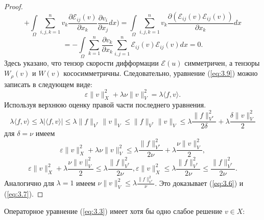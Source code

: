 \begin{proof}
$$+\int\limits_{\Omega}\sum_{i,j,k=1}^nv_k\frac{\partial\mathcal{E}_{ij}(v)}{\partial x_k}\frac{\partial v_i}{\partial x_j}dx\bigg)=
\int\limits_{\Omega}\sum_{i,j,k=1}^n v_k\frac{\partial (\mathcal{E}_{ij}(v)\mathcal{E}_{ij}(v))}{\partial x_k}dx$$
$$=-\int\limits_{\Omega}\sum_{k=1}^n \frac{\partial v_k}{\partial x_k}\sum_{i,j=1}^n\mathcal{E}_{ij}(v)\mathcal{E}_{ij}(v)dx=0.$$
Здесь указано, что тензор скорости дифформации $\mathcal{E}(u)$ симметричен, а тензоры $W_{\rho}(v)$ и $W(v)$ кососимметричны. 
Следовательно, уравнение (\ref{eq:3.9}) можно записать в следующем виде:
$$\varepsilon\|v\|^2_X+\lambda\nu\|v\|^2_V=\lambda\langle f,v\rangle.$$
Используя верхнюю оценку правой части последнего уравнения.
$$\lambda\langle f,v\rangle\leqslant\lambda |\langle f,v\rangle|\leqslant\lambda\|f\|_{V^*}\|v\|_V\leqslant\|f\|_{V^*}\|v\|_V\leqslant
\lambda\frac{\|f\|_{V^*}^2}{2\delta}+\lambda\frac{\delta\|v\|_V^2}{2}$$
для $\delta=\nu$ имеем
$$\varepsilon\|v\|^2_X+\lambda\nu\|v\|^2_V\leqslant\lambda\frac{\|f\|^2_{V^*}}{2\nu}+\lambda\frac{\nu\|v\|^2_V}{2},$$
$$\varepsilon\|v\|^2_X+\lambda\frac{\nu\|v\|^2_V}{2}\leqslant\lambda\frac{\|f\|^2_{V^*}}{2\nu}, \varepsilon\|v\|^2_X\leqslant\lambda
\frac{\|f\|^2_{V^*}}{2\nu}\leqslant\frac{\|f\|^2_{V^*}}{2\nu}.$$
Аналогично для $\lambda=1$ имеем $\nu\|v\|^2_V\leqslant\lambda\frac{\|f\|^2_{V^*}}{\nu}$. Это доказывает (\ref{eq:3.6}) и (\ref{eq:3.7}).
\end{proof}

\begin{theorem}
    Операторное уравнение (\ref{eq:3.3}) имеет хотя бы одно слабое решение $v\in X:$
\end{theorem}

